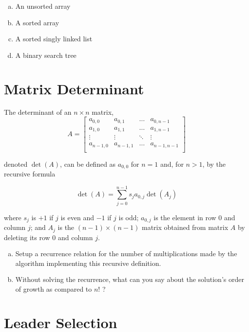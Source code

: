 \documentclass[12pt]{article}
\begin{document}
\begin{enumerate}[a.]
    \item An unsorted array
    \item A sorted array
    \item A sorted singly linked list
    \item A binary search tree
\end{enumerate}





\clearpage
\section{Matrix Determinant}

The determinant of an $n \times n$ matrix,
\[
A = \begin{bmatrix}
    a_{0,0} & a_{0,1} & \dots & a_{0,n-1} \\
    a_{1,0} & a_{1,1} & \dots & a_{1,n-1} \\
    \vdots  & \vdots  & \ddots & \vdots \\
    a_{n-1,0} & a_{n-1,1} & \dots & a_{n-1,n-1} \\
\end{bmatrix}
\]

denoted $\det(A)$, can be defined as $a_{0,0}$ for $n = 1$ and, for $n > 1$, by the recursive formula

\[
\det(A) = \sum_{j=0}^{n-1} s_j a_{0,j} \det(A_j)
\]

where $s_j$ is $+1$ if $j$ is even and $-1$ if $j$ is odd; $a_{0,j}$ is the element in row 0 and column $j$; and $A_j$ is the $(n-1) \times (n-1)$ matrix obtained from matrix $A$ by deleting its row 0 and column $j$.

\begin{enumerate}[a.]
    \item    Setup a recurrence relation for the number of multiplications made by the
algorithm implementing this recursive definition.
    \item Without solving the recurrence, what can you say about the solution's order
    of growth as compared to $n!$ ?
\end{enumerate}


\clearpage
\noindent
{}\vspace{-4.5em}
\section{Leader Selection}
\end{document}
